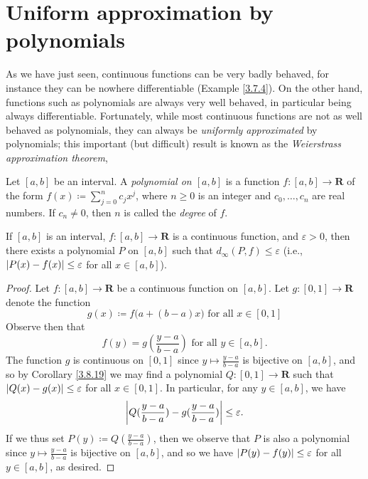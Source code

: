 \section{Uniform approximation by polynomials}\label{sec 3.8}

\begin{note}
    As we have just seen, continuous functions can be very badly behaved, for instance they can be nowhere differentiable (Example \ref{3.7.4}).
    On the other hand, functions such as polynomials are always very well behaved, in particular being always differentiable.
    Fortunately, while most continuous functions are not as well behaved as polynomials, they can always be \emph{uniformly approximated} by polynomials; this important (but difficult) result is known as the \emph{Weierstrass approximation theorem},
\end{note}

\begin{definition}\label{3.8.1}
    Let \([a, b]\) be an interval.
    A \emph{polynomial on \([a, b]\)} is a
    function \(f : [a, b] \to \mathbf{R}\) of the form \(f(x) \coloneqq \sum_{j = 0}^n c_j x^j\), where \(n \geq 0\) is an integer and \(c_0, \dots, c_n\) are real numbers.
    If \(c_n \neq 0\), then \(n\) is called the \emph{degree} of \(f\).
\end{definition}

\setcounter{theorem}{2}
\begin{theorem}\label{3.8.3}
    If \([a, b]\) is an interval, \(f : [a, b] \to \mathbf{R}\) is a continuous function, and \(\varepsilon > 0\), then there exists a polynomial \(P\) on \([a, b]\) such that \(d_\infty(P, f) \leq \varepsilon\)
    (i.e., \(\abs*{P(x) - f(x)} \leq \varepsilon\) for all \(x \in [a, b]\)).
\end{theorem}

\begin{proof}
    Let \(f : [a, b] \to \mathbf{R}\) be a continuous function on \([a, b]\).
    Let \(g : [0, 1] \to \mathbf{R}\) denote the function
    \[
        g(x) \coloneqq f\big(a + (b - a) x\big) \text{ for all } x \in [0, 1]
    \]
    Observe then that
    \[
        f(y) = g(\frac{y - a}{b - a}) \text{ for all } y \in [a, b].
    \]
    The function \(g\) is continuous on \([0, 1]\) since \(y \mapsto \frac{y - a}{b - a}\) is bijective on \([a, b]\), and so by Corollary \ref{3.8.19} we may find a polynomial \(Q : [0, 1] \to \mathbf{R}\) such that \(\abs*{Q(x) - g(x)} \leq \varepsilon\) for all \(x \in [0, 1]\).
    In particular, for any \(y \in [a, b]\), we have
    \[
        \abs*{Q(\frac{y - a}{b - a}) - g(\frac{y - a}{b - a})} \leq \varepsilon.
    \]
    If we thus set \(P(y) \coloneqq Q(\frac{y - a}{b - a})\), then we observe that \(P\) is also a polynomial since \(y \mapsto \frac{y - a}{b - a}\) is bijective on \([a, b]\), and so we have \(\abs*{P(y) - f(y)} \leq \varepsilon\) for all \(y \in [a, b]\), as desired.
\end{proof}

